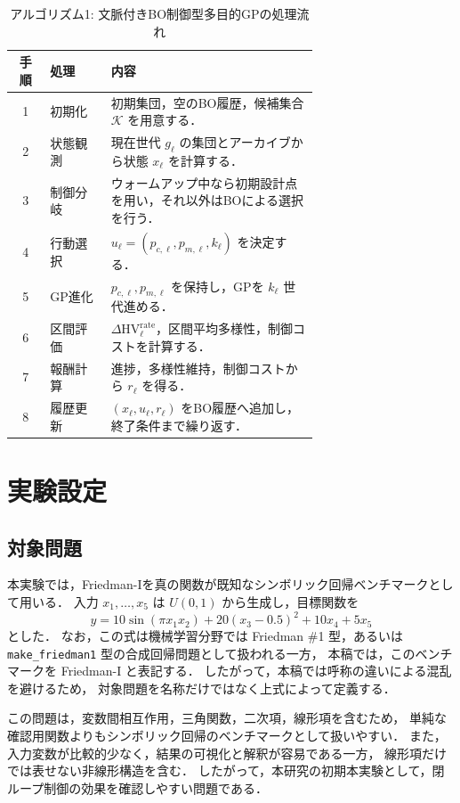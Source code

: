 \documentclass[a4paper,10pt,twocolumn]{ltjsarticle}
\newcommand{\HV}{\mathrm{HV}}
\begin{document}
\begin{table}[tb]
\centering
\caption{アルゴリズム1: 文脈付きBO制御型多目的GPの処理流れ}
\label{tab:algorithm}
\small
\begin{tabular}{@{}clp{0.68\linewidth}@{}}
\toprule
手順 & 処理 & 内容 \\
\midrule
1 & 初期化 & 初期集団，空のBO履歴，候補集合 \(\mathcal{K}\) を用意する． \\
2 & 状態観測 & 現在世代 \(g_\ell\) の集団とアーカイブから状態 \(x_\ell\) を計算する． \\
3 & 制御分岐 & ウォームアップ中なら初期設計点を用い，それ以外はBOによる選択を行う． \\
4 & 行動選択 & \(u_\ell=(p_{c,\ell},p_{m,\ell},k_\ell)\) を決定する． \\
5 & GP進化 & \(p_{c,\ell},p_{m,\ell}\) を保持し，GPを \(k_\ell\) 世代進める． \\
6 & 区間評価 & \(\Delta\HV^{\mathrm{rate}}_\ell\)，区間平均多様性，制御コストを計算する． \\
7 & 報酬計算 & 進捗，多様性維持，制御コストから \(r_\ell\) を得る． \\
8 & 履歴更新 & \((x_\ell,u_\ell,r_\ell)\) をBO履歴へ追加し，終了条件まで繰り返す． \\
\bottomrule
\end{tabular}
\end{table}

\section{実験設定}

\subsection{対象問題}

本実験では，Friedman-Iを真の関数が既知なシンボリック回帰ベンチマークとして用いる．
入力 \(x_1,\ldots,x_5\) は \(U(0,1)\) から生成し，目標関数を
\begin{equation}
y=
10\sin(\pi x_1x_2)
+20(x_3-0.5)^2
+10x_4
+5x_5
\end{equation}
とした．
なお，この式は機械学習分野では Friedman \#1 型，あるいは
\texttt{make\_friedman1} 型の合成回帰問題として扱われる一方，
本稿では，このベンチマークを Friedman-I と表記する．
したがって，本稿では呼称の違いによる混乱を避けるため，
対象問題を名称だけではなく上式によって定義する．

この問題は，変数間相互作用，三角関数，二次項，線形項を含むため，
単純な確認用関数よりもシンボリック回帰のベンチマークとして扱いやすい．
また，入力変数が比較的少なく，結果の可視化と解釈が容易である一方，
線形項だけでは表せない非線形構造を含む．
したがって，本研究の初期本実験として，閉ループ制御の効果を確認しやすい問題である．
\end{document}
